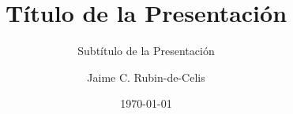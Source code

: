 \documentclass[
	9pt,
    aspectratio=169,
    professionalfonts,
	 handout %
]{beamer}
\title{Título de la Presentación}
\subtitle{Subtítulo de la Presentación}
\author{Jaime C. Rubin-de-Celis}
\institute{Universidad Técnica Federico Santa María}
\date{\today}
\numberwithin{equation}{section}
\begin{document}
\frame{\titlepage}


\end{document}
